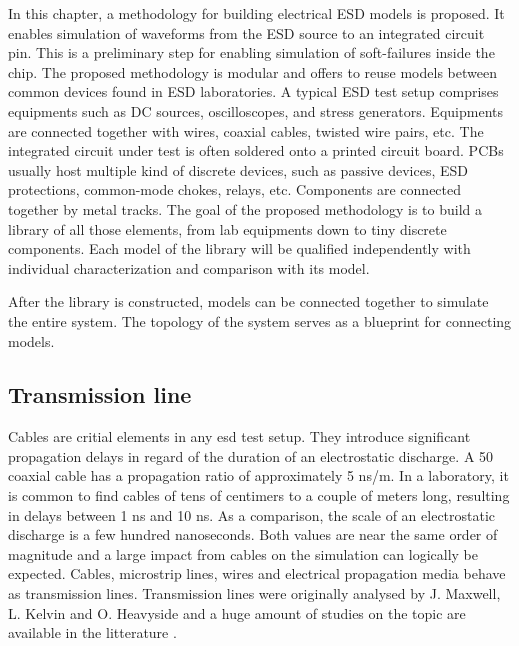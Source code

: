 In this chapter, a methodology for building electrical ESD models is proposed.
It enables simulation of waveforms from the ESD source to an integrated circuit pin.
This is a preliminary step for enabling simulation of soft-failures inside the chip.
The proposed methodology is modular and offers to reuse models between common devices found in ESD laboratories.
A typical ESD test setup comprises equipments such as DC sources, oscilloscopes, and stress generators.
Equipments are connected together with wires, coaxial cables, twisted wire pairs, etc.
The integrated circuit under test is often soldered onto a printed circuit board.
\gls{PCB}s usually host multiple kind of discrete devices, such as passive devices, ESD protections, common-mode chokes, relays, etc.
Components are connected together by metal tracks.
The goal of the proposed methodology is to build a library of all those elements, from lab equipments down to tiny discrete components.
Each model of the library will be qualified independently with individual characterization and comparison with its model.

After the library is constructed, models can be connected together to simulate the entire system.
The topology of the system serves as a blueprint for connecting models.

\subsection{Transmission line}

Cables are critial elements in any \gls{esd} test setup.
They introduce significant propagation delays in regard of the duration of an electrostatic discharge.
A 50\textOmega{} coaxial cable has a propagation ratio of approximately 5 ns/m.
In a laboratory, it is common to find cables of tens of centimers to a couple of meters long, resulting in delays between 1 ns and 10 ns.
As a comparison, the scale of an electrostatic discharge is a few hundred nanoseconds.
Both values are near the same order of magnitude and a large impact from cables on the simulation can logically be expected.
Cables, microstrip lines, wires and electrical propagation media behave as transmission lines.
Transmission lines were originally analysed by J. Maxwell, L. Kelvin and O. Heavyside and a huge amount of studies on the topic are available in the litterature \cite{branin-tl-ref, hf-coax,lossy-tl,emc-analysis-tl}.

